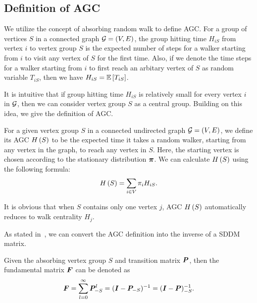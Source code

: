 \documentclass[journal]{IEEEtran}
\begin{document}
\subsection{Definition of AGC}

We utilize the concept of absorbing random walk to define AGC.
For a group of vertices \(S\) in a connected graph \(\mathcal{G}=(V,E)\), the group hitting time \(H_{iS}\) from vertex \(i\) to vertex group \(S\) is the expected number of steps for a walker starting from \(i\) to visit any vertex of \(S\) for the first time.
Also, if we denote the time steps for a walker starting from \(i\) to first reach an arbitary vertex of \(S\) as random variable \(T_{iS}\), then we have \(H_{iS}=\mathbb{E}\left[T_{iS}\right]\).

It is intuitive that if group hitting time \(H_{iS}\) is relatively small for every vertex \(i\) in \(\mathcal{G}\), then we can consider vertex group \(S\) as a central group.
Building on this idea, we give the definition of AGC.

\begin{definition}\label{def:manc}
    For a given vertex group \(S\) in a connected undirected graph \(\mathcal{G}=(V,E)\), we define its AGC \(H\left(S\right)\) to be the expected time it takes a random walker, starting from any vertex in the graph, to reach any vertex in \(S\). Here, the starting vertex is chosen according to the stationary distribution \(\boldsymbol{\pi}\). We can calculate \(H\left(S\right)\) using the following formula:
    \begin{equation*}
        H\left(S\right)=\sum_{i\in V}\pi_i H_{iS}.
    \end{equation*}
\end{definition}

It is obvious that when \(S\) contains only one vertex \(j\), AGC \(H\left(S\right)\) automatically reduces to walk centrality \(H_j\).

As stated in~\cite{KeSn76}, we can convert the AGC definition into the inverse of a SDDM matrix.

\begin{fact}
    Given the absorbing vertex group \(S\) and transition matrix \(\boldsymbol{P}\), then the fundamental matrix \(\boldsymbol{F}\) can be denoted as
    \begin{equation}\label{eq:funda}
        \boldsymbol{F}=\sum_{l=0}^\infty\boldsymbol{P}_{-S}^l=(\boldsymbol{I}-\boldsymbol{P}_{-S})^{-1}=(\boldsymbol{I}-\boldsymbol{P})_{-S}^{-1}.
    \end{equation}
\end{fact}
\end{document}
